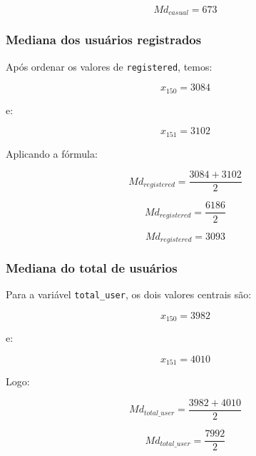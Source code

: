 \documentclass[12pt,a4paper]{article}
\begin{document}
\begin{equation}
\boxed{Md_{casual} = 673}
\end{equation}

\subsubsection*{Mediana dos usuários registrados}

Após ordenar os valores de \texttt{registered}, temos:

\begin{equation}
x_{150} = 3084
\end{equation}

e:

\begin{equation}
x_{151} = 3102
\end{equation}

Aplicando a fórmula:

\begin{equation}
Md_{registered} =
\frac{3084 + 3102}{2}
\end{equation}

\begin{equation}
Md_{registered} =
\frac{6186}{2}
\end{equation}

\begin{equation}
\boxed{Md_{registered} = 3093}
\end{equation}

\subsubsection*{Mediana do total de usuários}

Para a variável \texttt{total\_user}, os dois valores centrais são:

\begin{equation}
x_{150} = 3982
\end{equation}

e:

\begin{equation}
x_{151} = 4010
\end{equation}

Logo:

\begin{equation}
Md_{total\_user} =
\frac{3982 + 4010}{2}
\end{equation}

\begin{equation}
Md_{total\_user} =
\frac{7992}{2}
\end{equation}
\end{document}
